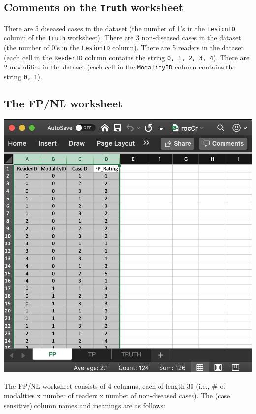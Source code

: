 \documentclass[
]{book}
\begin{document}
\hypertarget{quick-start-roc-truth-comments}{%
\subsection{\texorpdfstring{Comments on the \texttt{Truth} worksheet}{Comments on the Truth worksheet}}\label{quick-start-roc-truth-comments}}

There are 5 diseased cases in the dataset (the number of 1's in the \texttt{LesionID} column of the \texttt{Truth} worksheet). There are 3 non-diseased cases in the dataset (the number of 0's in the \texttt{LesionID} column). There are 5 readers in the dataset (each cell in the \texttt{ReaderID} column contains the string \texttt{0,\ 1,\ 2,\ 3,\ 4}). There are 2 modalities in the dataset (each cell in the \texttt{ModalityID} column contains the string \texttt{0,\ 1}).

\hypertarget{quick-start-roc-fp}{%
\subsection{The FP/NL worksheet}\label{quick-start-roc-fp}}

\includegraphics[width=1\textwidth,height=\textheight]{images/quick-start/rocCrFp.png}

The FP/NL worksheet consists of 4 columns, each of length 30 (i.e., \# of modalities x number of readers x number of non-diseased cases). The (case sensitive) column names and meanings are as follows:
\end{document}
